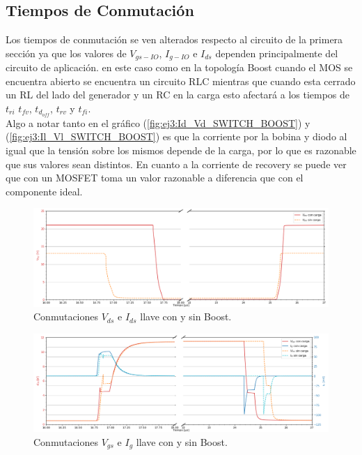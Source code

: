 \subsection{Tiempos de Conmutación}
Los tiempos de conmutación se ven alterados respecto al circuito de la primera sección ya que los valores de $V_{gs-IO}$, $I_{g-IO}$ e $I_{ds}$ dependen principalmente del circuito de aplicación.
en este caso como en la topología Boost cuando el MOS se encuentra abierto se encuentra un circuito RLC mientras que cuando esta cerrado un RL del lado del generador y un RC en la carga esto afectará a los tiempos de $t_{ri}$ $t_{fv}$, $t_{d_{off}}$, $t_{rv}$ y  $t_{fi}$.\\
Algo a notar tanto en el gráfico (\ref{fig:ej3:Id_Vd_SWITCH_BOOST}) y (\ref{fig:ej3:Il_Vl_SWITCH_BOOST}) es que la corriente por la bobina y diodo al igual que la tensión sobre los mismos  depende de la carga, por lo que es razonable que sus valores sean distintos. En cuanto a la corriente de recovery se puede ver que con un MOSFET toma un valor razonable a diferencia que con el componente ideal. 
\begin{multicols}{2}
\begin{figure}[H]
	\centering
	\includegraphics[width=0.9\linewidth]{ImagenesEjercicio-3/ids-vds-1v3}
	\caption{Conmutaciones $V_{ds}$ e  $I_{ds}$ llave con y sin Boost.}
	\label{fig:ej3:conmutacionON_OFF_VDS_IDS_SWITCH_BOOST}
\end{figure}
\begin{figure}[H]
	\centering
	\includegraphics[width=0.9\linewidth]{ImagenesEjercicio-3/ig-vgs-1v3}
	\caption{Conmutaciones $V_{gs}$ e  $I_{g}$ llave con y sin Boost.}
	\label{fig:ej3:conmutacionON_OFF_VGS_IG_SWITCH_BOOST}
\end{figure}
\end{multicols}
